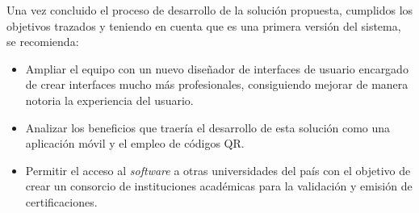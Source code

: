 \begin{recomendations}
Una vez concluido el proceso de desarrollo de la solución propuesta, cumplidos los objetivos trazados y teniendo en cuenta que es una primera versión del sistema, se recomienda:
\begin{itemize}
\item Ampliar el equipo con un nuevo diseñador de interfaces de usuario encargado de crear interfaces mucho más profesionales, consiguiendo mejorar de manera notoria la experiencia del usuario.
\item Analizar los beneficios que traería el desarrollo de esta solución como una aplicación móvil y el empleo de códigos QR.
\item Permitir el acceso al \textit{software} a otras universidades del país con el objetivo de crear un consorcio de instituciones académicas para la validación y emisión de certificaciones.
\end{itemize}





\end{recomendations}
